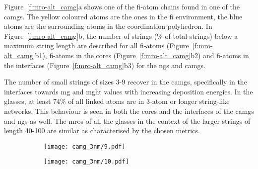 \begin{changebar}
Figure~\ref{f:mro-alt_camg}a shows one of the \gls{fi}-atom chains found in one of the \gls{camg}s. The yellow coloured atoms are the ones in the \gls{fi} environment, the blue atoms are the surrounding atoms in the coordination polyhedron. In Figure~\ref{f:mro-alt_camg}b, the number of strings (\% of total strings) below a maximum string length are described for all \gls{fi}-atoms (Figure~\ref{f:mro-alt_camg}b1), \gls{fi}-atoms in the cores (Figure~\ref{f:mro-alt_camg}b2) and \gls{fi}-atoms in the interfaces (Figure~\ref{f:mro-alt_camg}b3) for the \gls{ng}s and \gls{camg}s. \par The number of small strings of sizes 3-9 recover in the \gls{camg}s, specifically in the interfaces towards \gls{mg} and \gls{mght} values with increasing deposition energies. In the glasses, at least 74\% of all linked atoms are in 3-atom or longer string-like networks. This behaviour is seen in both the cores and the interfaces of the \gls{camg}s and \gls{ng}s as well. The \gls{mro}s of all the glasses in the context of the larger strings of length 40-100 are similar as characterised by the chosen metrics. \par

\begin{figure}[!h]
	\centering
	\begin{subfigure}{0.5\textwidth} \centering
		\texttt{[image: camg\_3nm/9.pdf]}
	\end{subfigure}%
	\hfill
	\begin{subfigure}{0.5\textwidth} \centering
		\texttt{[image: camg\_3nm/10.pdf]}
	\end{subfigure}%
	\label{f:mro_camg}
\end{figure}


\end{changebar}
